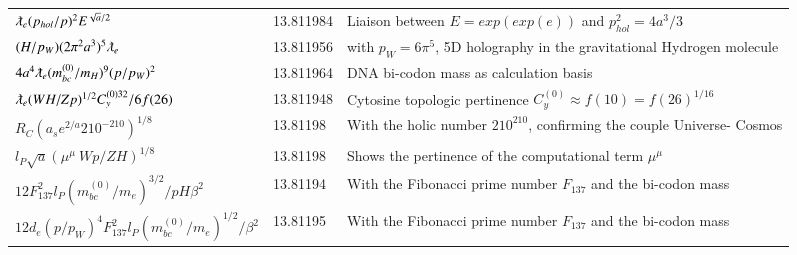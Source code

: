 \documentclass[a4paper,9pt]{article}
\begin{document}
\begin{table}
\begin{tabular}{lll}
  
 
  $ \lambdabar_e (p_{hol}/p)^2 E^{\sqrt a/2}$ & 13.811984 & Liaison between $E = exp(exp(e))$ and $p_{hol}^2 = 4a^3/3$   \\
  
 $(H/p_W)(2\pi^2 a^3)^5 \lambdabar_{e} $ & 13.811956 & with $p_W = 6\pi^5$, 5D holography in the gravitational Hydrogen molecule \cite{Sanchez3}  \\
 
 
 
   
  
  
  $ 4 a^4 \lambdabar_{e} (m_{bc}^{(0)}/m_H)^9 (p/p_W)^2  $ & 13.811964 & DNA bi-codon mass as calculation basis  \\
  
  
  $ \lambdabar_{e} (WH/Zp)^{1/2} C_y^{(0)32}/6f(26)   $ & 13.811948 & Cytosine topologic pertinence  $C_y^{(0)} \approx f(10)= f(26)^{1/16} $  \\
  
   
 $R_C (a_se^{2/a}210^{-210})^{1/8}$  & 13.81198    & With the holic number $210^{210}$, confirming the couple Universe- Cosmos \\
 
 
 $ l_{P} \sqrt a (\mu^{\mu}~Wp/ZH)^{1/8}$  & 13.81198 & Shows the pertinence of the computational term $\mu^{\mu}$   \\
 
 
  $12 F_{137}^2 l_P(m_{bc}^{(0)}/m_e)^{3/2}/pH\beta^2$ & 13.81194    & With the Fibonacci prime number $F_{137}$ and the bi-codon mass\\
  
  $12 d_e (p/p_W)^4 F_{137}^2 l_P(m_{bc}^{(0)}/m_e)^{1/2}/\beta^2$ & 13.81195    & With the Fibonacci prime number $F_{137}$ and the bi-codon mass\\
  

\end{tabular}
\end{table}
\end{document}
